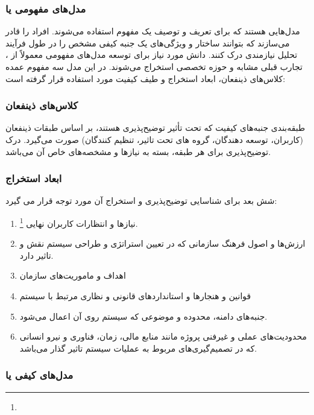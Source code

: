 \subsubsection{مدل‌های مفهومی یا }

مدل‌هایی هستند که برای تعریف و توصیف یک مفهوم استفاده می‌شوند. افراد را قادر
می‌سازند که بتوانند ساختار و ویژگی‌های یک جنبه کیفی مشخص را در طول فرآیند تحلیل
نیازمندی درک کنند. دانش مورد نیاز برای توسعه مدل‌های مفهومی معمولاً از
، تجارب قبلی مشابه و حوزه تخصصی استخراج می‌شوند. در این مدل سه
مفهوم عمده کلاس‌های ذینفعان، ابعاد استخراج و طیف کیفیت مورد استفاده قرار گرفته
است:

\subsubsection*{کلاس‌های ذینفعان}

طبقه‌بندی جنبه‌های کیفیت که تحت تأثیر توضیح‌پذیری هستند، بر اساس طبقات ذینفعان
(کاربران، توسعه دهندگان، گروه های تحت تاثیر، تنظیم کنندگان) صورت می‌گیرد. درک
توضیح‌پذیری برای هر طبقه، بسته به نیازها و مشخصه‌های خاص آن می‌باشد.

\subsubsection*{ابعاد استخراج}

شش بعد برای شناسایی توضیح‌پذیری و استخراج آن مورد توجه قرار می گیرد:

\begin{enumerate}
    \item نیاز‌ها و انتظارات کاربران نهایی \footnote{}.
    \item ارزش‌ها و اصول فرهنگ سازمانی که در تعیین استراتژی و طراحی سیستم نقش و
    تاثیر دارد.
    \item اهداف و ماموریت‌های سازمان
    \item قوانین و هنجار‌ها و استاندارد‌های قانونی و نظاری مرتبط با سیستم
    \item جنبه‌های دامنه، محدوده و موضوعی که سیستم روی آن اعمال می‌شود.
    \item محدودیت‌های عملی و غیرفنی پروژه‌ مانند منابع مالی، زمان، فناوری و نیرو
    انسانی که در تصمیم‌گیری‌های مربوط به عملیات سیستم تاثیر گذار می‌باشد.
\end{enumerate}

\subsubsection{مدل‌های کیفی یا }


